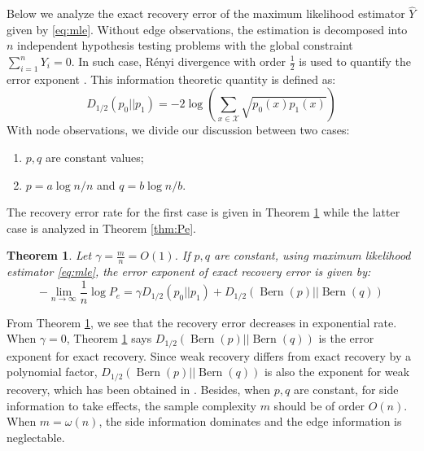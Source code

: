 \documentclass[conference]{IEEEtran}
\newtheorem{theorem}{Theorem}
\DeclareMathOperator{\Bern}{Bern}
\begin{document}
Below we analyze the exact recovery error of the maximum likelihood estimator $\hat{Y}$
given by \eqref{eq:mle}.
Without edge observations, the estimation is decomposed into $n$
independent hypothesis testing problems with the global constraint $\sum_{i=1}^n Y_i=0$. 
In such case, Rényi divergence with order $\frac{1}{2}$
is used to quantify the error exponent \cite{gao2018community}.
This information theoretic quantity is defined as:
\begin{equation}
D_{1/2}(p_0 || p_1) = -2\log(\sum_{x \in \mathcal{X}} \sqrt{p_0(x)p_1(x)} )
\end{equation}
With node observations, we divide our discussion between two cases:
\begin{enumerate}
\item $p,q$ are constant values;
\item $p = a \log n /n$ and $q = b \log n / b$.
\end{enumerate}
The recovery error rate for the first case is given in Theorem \ref{thm:constant} while
the latter case is analyzed in Theorem \ref{thm:Pe}.
\begin{theorem}\label{thm:constant}
	Let $\gamma = \frac{m}{n} = O(1)$. If $p,q$ are constant, using maximum likelihood estimator \eqref{eq:mle},
	the error exponent of exact recovery error is given by:
	\begin{equation}
	-\lim_{n\to \infty} \frac{1}{n}\log P_e =  \gamma D_{1/2}(p_0 || p_1) + D_{1/2}(\Bern(p)||\Bern(q))
	\end{equation} 
\end{theorem}
From Theorem \ref{thm:constant}, we see that the recovery error decreases in exponential rate.
When $\gamma=0$, Theorem \ref{thm:constant} says $D_{1/2}(\Bern(p)||\Bern(q))$
is the error exponent for exact recovery. Since weak recovery differs from exact recovery by a polynomial factor, $D_{1/2}(\Bern(p)||\Bern(q))$ is also the exponent for weak recovery, which has been obtained
in \cite{zhang2016}. Besides, when $p,q$ are constant, for side information to take effects, the sample complexity $m$ should be of order $O(n)$. When $m=\omega(n)$, the side information dominates and the edge information is neglectable.
\end{document}
